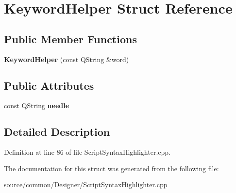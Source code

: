 \hypertarget{struct_keyword_helper}{\section{Keyword\-Helper Struct Reference}
\label{struct_keyword_helper}
}
\subsection*{Public Member Functions}
\begin{DoxyCompactItemize}
\item 
\hypertarget{struct_keyword_helper_ace2a6c37174fe771645d7afdb05c9982}{{\bfseries Keyword\-Helper} (const Q\-String \&word)}\label{struct_keyword_helper_ace2a6c37174fe771645d7afdb05c9982}

\end{DoxyCompactItemize}
\subsection*{Public Attributes}
\begin{DoxyCompactItemize}
\item 
\hypertarget{struct_keyword_helper_a7abd0e75a5d3dd71917702817996fe3b}{const Q\-String {\bfseries needle}}\label{struct_keyword_helper_a7abd0e75a5d3dd71917702817996fe3b}

\end{DoxyCompactItemize}


\subsection{Detailed Description}


Definition at line 86 of file Script\-Syntax\-Highlighter.\-cpp.



The documentation for this struct was generated from the following file\-:\begin{DoxyCompactItemize}
\item 
source/common/\-Designer/Script\-Syntax\-Highlighter.\-cpp\end{DoxyCompactItemize}
